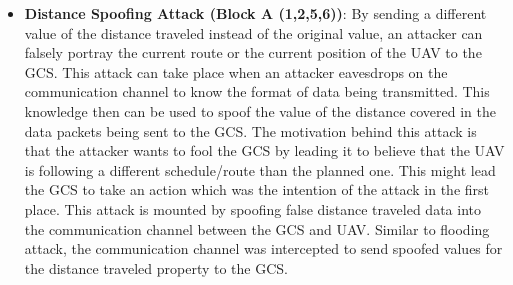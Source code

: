 \begin{itemize}
\item {\bf Distance Spoofing Attack (Block A (1,2,5,6))}: By sending a different value of the distance traveled instead of the original value, an attacker can falsely portray the current route or the current position of the \ac{UAV} to the \ac{GCS}. This attack can take place when an attacker eavesdrops on the communication channel to know the format of data being transmitted. This knowledge then can be used to spoof the value of the distance covered in the data packets being sent to the \ac{GCS}. The motivation behind this attack is that the attacker wants to fool the \ac{GCS} by leading it to believe that the \ac{UAV} is following a different schedule/route than the planned one. This might lead the \ac{GCS} to take an action which was the intention of the attack in the first place. This attack is mounted by spoofing false distance traveled data into the communication channel between the \ac{GCS} and \ac{UAV}. Similar to flooding attack, the communication channel was intercepted to send spoofed values for the distance traveled property to the \ac{GCS}.
\end{itemize}


